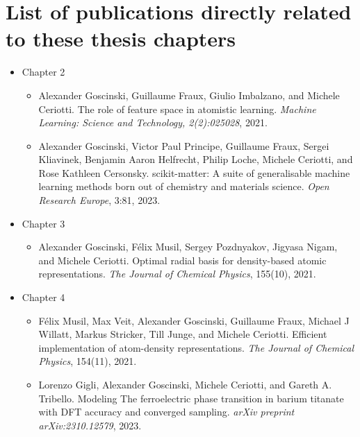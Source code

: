 \section*{List of publications directly related to these thesis chapters}
\begin{itemize}
  \item Chapter 2
  \begin{itemize}
    \item Alexander Goscinski, Guillaume Fraux, Giulio Imbalzano, and Michele Ceriotti. The role of feature space in atomistic learning. \textit{Machine Learning: Science and Technology, 2(2):025028}, 2021.
    \item Alexander Goscinski, Victor Paul Principe, Guillaume Fraux, Sergei Kliavinek, Benjamin Aaron Helfrecht, Philip Loche, Michele Ceriotti, and Rose Kathleen Cersonsky. scikit-matter: A suite of generalisable machine learning methods born out of chemistry and materials science. \textit{Open Research Europe}, 3:81, 2023.
  \end{itemize}
  \item Chapter 3
  \begin{itemize}
    \item Alexander Goscinski, Félix Musil, Sergey Pozdnyakov, Jigyasa Nigam, and Michele Ceriotti. Optimal radial basis for density-based atomic representations. \textit{The Journal of Chemical Physics}, 155(10), 2021.
  \end{itemize}
  \item Chapter 4
  \begin{itemize}
    \item Félix Musil, Max Veit, Alexander Goscinski, Guillaume Fraux, Michael J Willatt, Markus Stricker, Till Junge, and Michele Ceriotti. Efficient implementation of atom-density representations. \textit{The Journal of Chemical Physics}, 154(11), 2021.
    \item Lorenzo Gigli, Alexander Goscinski, Michele Ceriotti, and Gareth A. Tribello. Modeling The ferroelectric phase transition in barium titanate with DFT accuracy and converged sampling. \textit{arXiv preprint arXiv:2310.12579}, 2023.
  \end{itemize}

\end{itemize}


